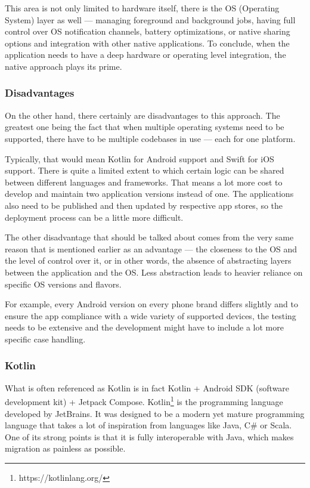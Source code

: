 \documentclass[
  digital,     %
  color,       %
  oneside,     %
  nosansbold,  %
  nocolorbold, %
  lof,         %
  lot,         %
]{fithesis4}
\begin{document}
This area is not only limited to hardware itself, there is the OS (Operating System) layer as well --- managing foreground and background jobs, having full control over OS notification channels, battery optimizations, or native sharing options and integration with other native applications. To conclude, when the application needs to have a deep hardware or operating level integration, the native approach plays its prime.

\subsubsection{Disadvantages}
On the other hand, there certainly are disadvantages to this approach. The greatest one being the fact that when multiple operating systems need to be supported, there have to be multiple codebases in use --- each for one platform. 

Typically, that would mean Kotlin for Android support and Swift for iOS support. There is quite a limited extent to which certain logic can be shared between different languages and frameworks. That means a lot more cost to develop and maintain two application versions instead of one. The applications also need to be published and then updated by respective app stores, so the deployment process can be a little more difficult.

The other disadvantage that should be talked about comes from the very same reason that is mentioned earlier as an advantage --- the closeness to the OS and the level of control over it, or in other words, the absence of abstracting layers between the application and the OS. Less abstraction leads to heavier reliance on specific OS versions and flavors. 

For example, every Android version on every phone brand differs slightly and to ensure the app compliance with a wide variety of supported devices, the testing needs to be extensive and the development might have to include a lot more specific case handling.

\subsubsection{Kotlin}
What is often referenced as Kotlin is in fact Kotlin + Android SDK (software development kit) + Jetpack Compose. Kotlin\footnote{https://kotlinlang.org/} is the programming language developed by JetBrains. It was designed to be a modern yet mature programming language that takes a lot of inspiration from languages like Java, C\# or Scala\cite{kotlinOverview}. One of its strong points is that it is fully interoperable with Java, which makes migration as painless as possible. 
\end{document}
